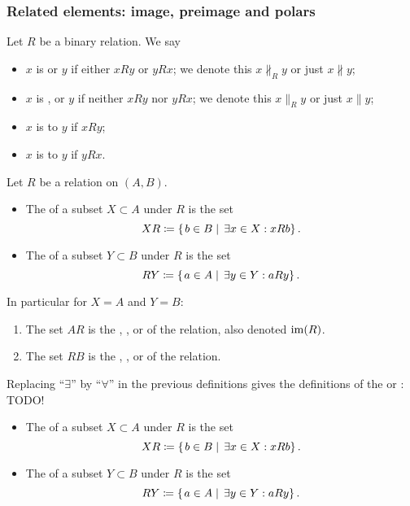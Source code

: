 \subsubsection{Related elements: image, preimage and polars}
\begin{definition}
Let $R$ be a binary relation. We say
\begin{itemize}
\item $x$ is  or  $y$ if either $xRy$ or $yRx$; we denote this $x\nparallel_R y$ or just $x\nparallel y$;
\item $x$ is ,  or  $y$ if neither $xRy$ nor $yRx$; we denote this $x\parallel_R y$ or just $x\parallel y$;
\item $x$ is  to $y$ if $xRy$;
\item $x$ is  to $y$ if $yRx$.
\end{itemize}
\end{definition}

\begin{definition}
Let $R$ be a relation on $(A, B)$.
\begin{itemize}
\item The  of a subset $X\subset A$ under $R$ is the set
\[ XR \coloneqq \left\{\left. b\in B \;\right|\; \exists x\in X: xRb \right\}. \]
\item The  of a subset $Y\subset B$ under $R$ is the set
\[ RY \coloneqq \left\{\left. a\in A \;\right|\; \exists y\in Y: aRy \right\}. \]
\end{itemize}
In particular for $X=A$ and $Y=B$:
\begin{enumerate}
\item The set $AR$ is the , ,  or  of the relation, also denoted $\operatorname{im}(R)$.
\item The set $RB$ is the , ,  or  of the relation.
\end{enumerate}
Replacing ``$\exists$'' by ``$\forall$'' in the previous definitions gives the definitions of the  or : TODO!
\begin{itemize}
\item The  of a subset $X\subset A$ under $R$ is the set
\[ XR \coloneqq \left\{\left. b\in B \;\right|\; \exists x\in X: xRb \right\}. \]
\item The  of a subset $Y\subset B$ under $R$ is the set
\[ RY \coloneqq \left\{\left. a\in A \;\right|\; \exists y\in Y: aRy \right\}. \]
\end{itemize}
\end{definition}

